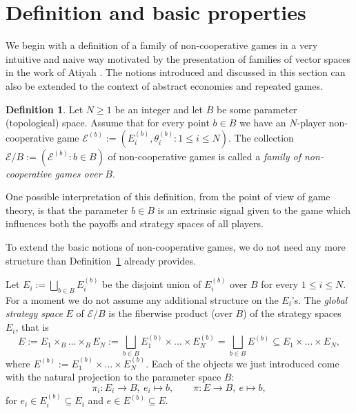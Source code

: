 \documentclass[a4paper,11pt,reqno,english]{amsart}
\theoremstyle{plain}
\theoremstyle{definition}
\newtheorem{definition}[theorem]{Definition}
\newcommand{\Ecal}{\mathcal{E}}
\begin{document}
\section{Definition and basic properties}\label{sec:familes_of_games}
We begin with a definition of a family of non-cooperative games in a very intuitive and naive way motivated by the presentation of families of vector spaces in the work of Atiyah \cite{Atiyah1967}.
The notions introduced and discussed in this section can also be extended to the context of abstract economies and repeated games.

\begin{definition}\label{def:FamilyOfNonCooperativeGamesNaive}
	Let $N \geq 1$ be an integer and let $B$ be some parameter (topological) space.
	Assume that for every point $b\in B$ we have an $N$-player non-cooperative game $\Ecal^{(b)}:=(E^{(b)}_i,\theta^{(b)}_i : 1\leq i\leq N)$.
	The collection $\Ecal/B:=(\Ecal^{(b)}:b\in B)$ of non-cooperative games is called a {\em family of non-cooperative games over} $B$.
\end{definition}

One possible interpretation of this definition, from the point of view of game theory, is that the parameter $b\in B$ is an extrinsic signal given to the game which influences both the payoffs and strategy spaces of all players.

\medskip
To extend the basic notions of non-cooperative games, we do not need any more structure than Definition~\ref{def:FamilyOfNonCooperativeGamesNaive} already provides.

\medskip
Let $E_i := \bigsqcup_{b\in B} E_i^{(b)}$ be the disjoint union of $E_i^{(b)}$ over $B$ for every $1\leq i\leq N$.
For a moment we do not assume any additional structure on the $E_i$'s.
The {\em global strategy space} $E$  of $\Ecal/B$ is the fiberwise product (over $B$) of the strategy spaces $E_i$, that is
\begin{displaymath}
	E := E_1 \times_B \dots \times_B E_N := \bigsqcup_{b\in B}  E_1^{(b)}\times\dots\times E_N^{(b)}=\bigsqcup_{b\in B}  E^{(b)} \subseteq E_1\times\dots\times E_N,
\end{displaymath}
where $ E^{(b)}:=E_1^{(b)}\times\dots\times E_N^{(b)}$.
Each of the objects we just introduced come with the natural projection to the parameter space $B$:
\begin{displaymath}
	\pi_i\colon E_i\longrightarrow B, \ e_i\longmapsto b,\qquad
	\pi\colon E\longrightarrow B, \ e\longmapsto b,
\end{displaymath}
for $e_i\in E_i^{(b)}\subseteq E_i$ and $e\in E^{(b)}\subseteq E$.
\end{document}
